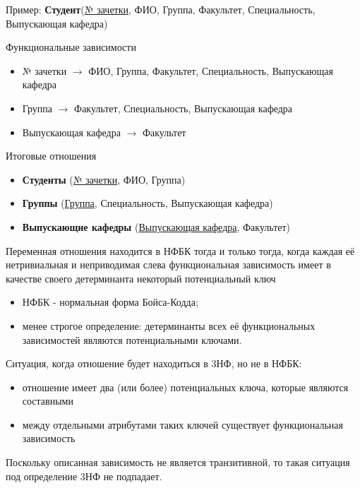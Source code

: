 \documentclass{beamer}
\begin{document}
\begin{frame}
Пример: \textbf{Студент}(\underline{№ зачетки}, ФИО, Группа, Факультет, Специальность, Выпускающая кафедра)
\begin{block}{Функциональные зависимости}
\begin{itemize}
\item № зачетки $\rightarrow$ ФИО, Группа, Факультет, Специальность, Выпускающая кафедра
\item Группа $\rightarrow$ Факультет, Специальность, Выпускающая кафедра
\item Выпускающая кафедра $\rightarrow$ Факультет
\end{itemize}
\end{block}
\begin{block}{Итоговые отношения}  
\begin{itemize}
\item \textbf{Студенты} (\underline{№ зачетки}, ФИО, Группа)
\item \textbf{Группы} (\underline{Группа}, Специальность, Выпускающая кафедра)
\item \textbf{Выпускающие кафедры} (\underline{Выпускающая кафедра}, Факультет)
\end{itemize}
\end{block}
\end{frame}

\begin{frame}
\begin{block}{Переменная отношения находится в НФБК}
тогда и только тогда, когда каждая её нетривиальная и неприводимая слева функциональная зависимость имеет в качестве своего детерминанта некоторый потенциальный ключ
\begin{itemize}
\item НФБК - нормальная форма Бойса-Кодда;
\item менее строгое определение: детерминанты всех её функциональных зависимостей являются потенциальными ключами.
\end{itemize}
\end{block}
Ситуация, когда отношение будет находиться в 3НФ, но не в НФБК:
\begin{itemize}
\item отношение имеет два (или более) потенциальных ключа, которые являются составными
\item между отдельными атрибутами таких ключей существует функциональная зависимость
\end{itemize}
Поскольку описанная зависимость не является транзитивной, то такая ситуация под определение 3НФ не подпадает. 
\end{frame}
\end{document}
